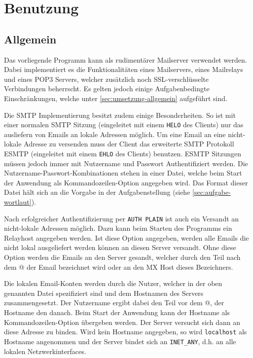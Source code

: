 \documentclass[final,a4paper,11pt,notitlepage,halfparskip]{scrreprt}
\begin{document}
\chapter{Benutzung}

\section{Allgemein}
Das vorliegende Programm kann als rudimentärer Mailserver verwendet werden.
Dabei implementiert es die Funktionalitäten eines Mailservers, eines Mailrelays
und eines POP3 Servers, welcher zusätzlich noch SSL-verschlüsselte Verbindungen
beherrscht. Es gelten jedoch einige Aufgabenbedingte Einschränkungen, welche
unter \ref{sec:umsetzung-allgemein} aufgeführt sind.

Die SMTP Implementierung besitzt zudem einige Besonderheiten. So ist mit einer
normalen SMTP Sitzung (eingeleitet mit einem \texttt{HELO} des Clients) nur das
ausliefern von Emails an lokale Adressen möglich. Um eine Email an eine
nicht-lokale Adresse zu versenden muss der Client das erweiterte SMTP Protokoll
ESMTP (eingeleitet mit einem \texttt{EHLO} des Clients) benutzen. ESMTP
Sitzungen müssen jedoch immer mit Nutzername und Passwort Authentifiziert
werden. Die Nutzername-Passwort-Kombinationen stehen in einer Datei, welche beim
Start der Anwendung als Kommandozeilen-Option angegeben wird. Das Format dieser
Datei hält sich an die Vorgabe in der Aufgabenstellung (siehe
\ref{sec:aufgabe-wortlaut}). 

Nach erfolgreicher Authentifizierung per \texttt{AUTH PLAIN} ist auch ein
Versandt an nicht-lokale Adressen möglich. Dazu kann beim Starten des Programms
ein Relayhost angegeben werden. Ist diese Option angegeben, werden alle Emails
die nicht lokal ausgeliefert werden können an diesen Server versandt. Ohne diese
Option werden die Emails an den Server gesandt, welcher durch den Teil nach dem
@ der Email bezeichnet wird oder an den MX Host dieses Bezeichners.

Die lokalen Email-Konten werden durch die Nutzer, welcher in der oben genannten
Datei spezifiziert sind und dem Hostnamen des Servers zusammengesetzt. Der
Nutzername ergibt dabei den Teil vor dem @, der Hostname den danach. Beim Start
der Anwendung kann der Hostname als Kommandozeilen-Option übergeben werden. Der
Server versucht sich dann an diese Adresse zu binden. Wird kein Hostname
angegeben, so wird \texttt{localhost} als Hostname angenommen und der Server
bindet sich an \texttt{INET\_ANY}, d.h. an alle lokalen Netzwerkinterfaces.
\end{document}
